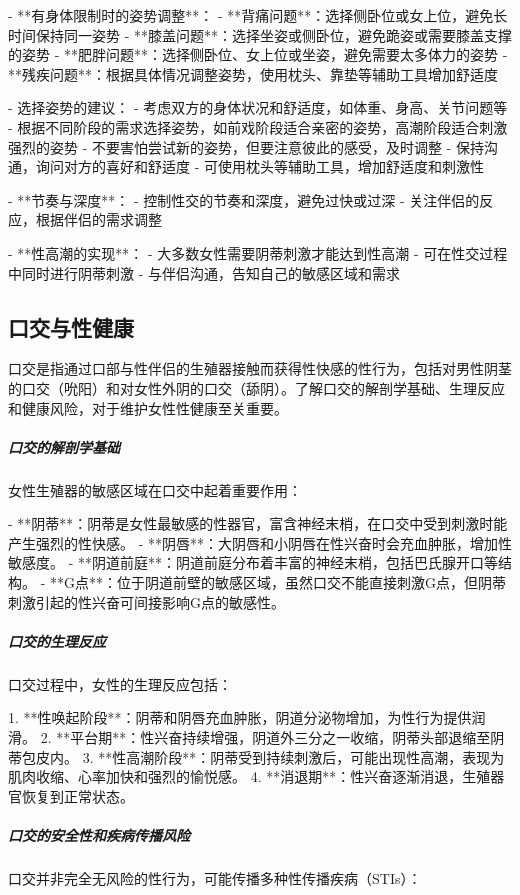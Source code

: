 \begin{enumerate}
  - **有身体限制时的姿势调整**：
    - **背痛问题**：选择侧卧位或女上位，避免长时间保持同一姿势
    - **膝盖问题**：选择坐姿或侧卧位，避免跪姿或需要膝盖支撑的姿势
    - **肥胖问题**：选择侧卧位、女上位或坐姿，避免需要太多体力的姿势
    - **残疾问题**：根据具体情况调整姿势，使用枕头、靠垫等辅助工具增加舒适度

  - 选择姿势的建议：
    - 考虑双方的身体状况和舒适度，如体重、身高、关节问题等
    - 根据不同阶段的需求选择姿势，如前戏阶段适合亲密的姿势，高潮阶段适合刺激强烈的姿势
    - 不要害怕尝试新的姿势，但要注意彼此的感受，及时调整
    - 保持沟通，询问对方的喜好和舒适度
    - 可使用枕头等辅助工具，增加舒适度和刺激性

- **节奏与深度**：
  - 控制性交的节奏和深度，避免过快或过深
  - 关注伴侣的反应，根据伴侣的需求调整

- **性高潮的实现**：
  - 大多数女性需要阴蒂刺激才能达到性高潮
  - 可在性交过程中同时进行阴蒂刺激
  - 与伴侣沟通，告知自己的敏感区域和需求

\subsection{口交与性健康}

口交是指通过口部与性伴侣的生殖器接触而获得性快感的性行为，包括对男性阴茎的口交（吮阳）和对女性外阴的口交（舔阴）。了解口交的解剖学基础、生理反应和健康风险，对于维护女性性健康至关重要。

\subparagraph{口交的解剖学基础}

女性生殖器的敏感区域在口交中起着重要作用：

- **阴蒂**：阴蒂是女性最敏感的性器官，富含神经末梢，在口交中受到刺激时能产生强烈的性快感。
- **阴唇**：大阴唇和小阴唇在性兴奋时会充血肿胀，增加性敏感度。
- **阴道前庭**：阴道前庭分布着丰富的神经末梢，包括巴氏腺开口等结构。
- **G点**：位于阴道前壁的敏感区域，虽然口交不能直接刺激G点，但阴蒂刺激引起的性兴奋可间接影响G点的敏感性。

\subparagraph{口交的生理反应}

口交过程中，女性的生理反应包括：

1. **性唤起阶段**：阴蒂和阴唇充血肿胀，阴道分泌物增加，为性行为提供润滑。
2. **平台期**：性兴奋持续增强，阴道外三分之一收缩，阴蒂头部退缩至阴蒂包皮内。
3. **性高潮阶段**：阴蒂受到持续刺激后，可能出现性高潮，表现为肌肉收缩、心率加快和强烈的愉悦感。
4. **消退期**：性兴奋逐渐消退，生殖器官恢复到正常状态。

\subparagraph{口交的安全性和疾病传播风险}

口交并非完全无风险的性行为，可能传播多种性传播疾病（STIs）：


\end{enumerate}
